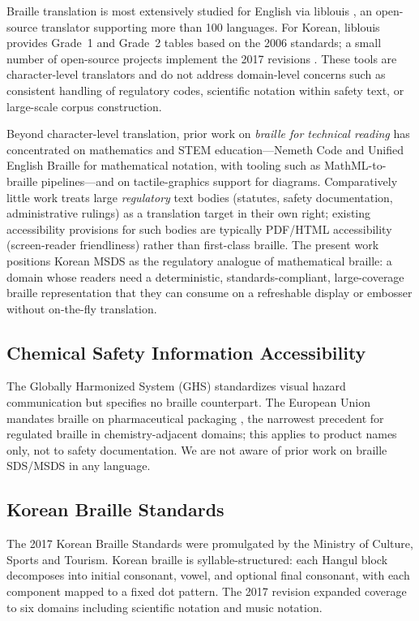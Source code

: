 \documentclass[smallextended]{svjour3}
\begin{document}
Braille translation is most extensively studied for English via liblouis \cite{liblouis}, an open-source translator supporting more than 100 languages. For Korean, liblouis provides Grade~1 and Grade~2 tables based on the 2006 standards; a small number of open-source projects implement the 2017 revisions \cite{hangul_braille_converter,hanbraille}. These tools are character-level translators and do not address domain-level concerns such as consistent handling of regulatory codes, scientific notation within safety text, or large-scale corpus construction.

Beyond character-level translation, prior work on \emph{braille for technical reading} has concentrated on mathematics and STEM education---Nemeth Code and Unified English Braille for mathematical notation, with tooling such as MathML-to-braille pipelines---and on tactile-graphics support for diagrams. Comparatively little work treats large \emph{regulatory} text bodies (statutes, safety documentation, administrative rulings) as a translation target in their own right; existing accessibility provisions for such bodies are typically PDF/HTML accessibility (screen-reader friendliness) rather than first-class braille. The present work positions Korean MSDS as the regulatory analogue of mathematical braille: a domain whose readers need a deterministic, standards-compliant, large-coverage braille representation that they can consume on a refreshable display or embosser without on-the-fly translation.

\subsection{Chemical Safety Information Accessibility}

The Globally Harmonized System (GHS) \cite{ghs} standardizes visual hazard communication but specifies no braille counterpart. The European Union mandates braille on pharmaceutical packaging \cite{eu_braille}, the narrowest precedent for regulated braille in chemistry-adjacent domains; this applies to product names only, not to safety documentation. We are not aware of prior work on braille SDS/MSDS in any language.

\subsection{Korean Braille Standards}

The 2017 Korean Braille Standards \cite{ko_braille_2017} were promulgated by the Ministry of Culture, Sports and Tourism. Korean braille is syllable-structured: each Hangul block decomposes into initial consonant, vowel, and optional final consonant, with each component mapped to a fixed dot pattern. The 2017 revision expanded coverage to six domains including scientific notation and music notation.
\end{document}
